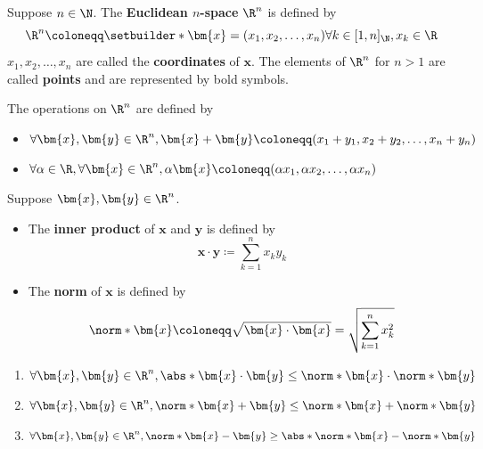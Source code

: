 \begin{definition} \label{an1:def:euclidean-space}
  Suppose $n \in \N$. The \textbf{Euclidean $n$-space} $\R^{n}$ is defined by
  \[
    \R^{n} \coloneqq \setbuilder*{\bm{x} = (x_{1}, x_{2}, \dots, x_{n})}{\forall k \in [1, n]_{\N}, x_{k} \in \R}
  \]
  $x_{1}, x_{2}, \dots, x_{n}$ are called the \textbf{coordinates} of $\bm{x}$.
  The elements of $\R^{n}$ for $n > 1$ are called \textbf{points} and are represented by bold symbols.
\end{definition}

\begin{definition} \label{an1:def:operations-on-Rn}
  The operations on $\R^{n}$ are defined by
  \begin{itemize}
    \item $\forall \bm{x}, \bm{y} \in \R^{n},
            \bm{x} + \bm{y} \coloneqq (x_{1} + y_{1}, x_{2} + y_{2}, \dots, x_{n} + y_{n})$
    \item $\forall \alpha \in \R, \forall \bm{x} \in \R^{n},
            \alpha \bm{x} \coloneqq (\alpha x_{1}, \alpha x_{2}, \dots, \alpha x_{n})$
  \end{itemize}
\end{definition}

\begin{definition} \label{an1:def:inner-product-norm}
  Suppose $\bm{x}, \bm{y} \in \R^{n}$.
  \begin{itemize}
    \item The \textbf{inner product} of $\bm{x}$ and $\bm{y}$ is defined by
          \[
            \bm{x} \cdot \bm{y} \coloneqq \sum_{k = 1}^{n} x_{k}y_{k}
          \]
    \item The \textbf{norm} of $\bm{x}$ is defined by
          \[
            \norm*{\bm{x}} \coloneqq \sqrt{\bm{x} \cdot \bm{x}} = \sqrt{\sum_{k = 1}^{n} x_{k}^{2}}
          \]
  \end{itemize}
\end{definition}

\begin{theorem} \label{an1:thm:properties-of-inner-product-norm}
  \leavevmode\par
  \begin{enumerate}[label=\textbf{(\Alph*)}]
    \item $\forall \bm{x}, \bm{y} \in \R^{n}, \abs*{\bm{x} \cdot \bm{y}} \leq \norm*{\bm{x}} \cdot \norm*{\bm{y}}$
    \item $\forall \bm{x}, \bm{y} \in \R^{n}, \norm*{\bm{x} + \bm{y}} \leq \norm*{\bm{x}} + \norm*{\bm{y}}$
    \item $\forall \bm{x}, \bm{y} \in \R^{n}, \norm*{\bm{x} - \bm{y}} \geq \abs*{\norm*{\bm{x}} - \norm*{\bm{y}}}$
  \end{enumerate}
\end{theorem}

